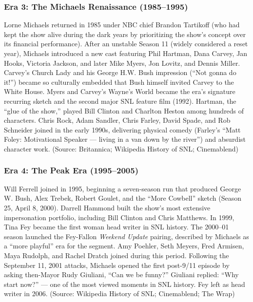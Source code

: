 \documentclass[11pt,letterpaper]{article}
\begin{document}
\subsubsection{Era 3: The Michaels Renaissance (1985--1995)}

Lorne Michaels returned in 1985 under NBC chief Brandon Tartikoff (who had kept the show alive during the dark years by prioritizing the show's concept over its financial performance). After an unstable Season 11 (widely considered a reset year), Michaels introduced a new cast featuring Phil Hartman, Dana Carvey, Jan Hooks, Victoria Jackson, and later Mike Myers, Jon Lovitz, and Dennis Miller. Carvey's Church Lady and his George H.W. Bush impression (``Not gonna do it!'') became so culturally embedded that Bush himself invited Carvey to the White House. Myers and Carvey's Wayne's World became the era's signature recurring sketch and the second major SNL feature film (1992). Hartman, the ``glue of the show,'' played Bill Clinton and Charlton Heston among hundreds of characters. Chris Rock, Adam Sandler, Chris Farley, David Spade, and Rob Schneider joined in the early 1990s, delivering physical comedy (Farley's ``Matt Foley: Motivational Speaker --- living in a van down by the river'') and absurdist character work. (Source: Britannica; Wikipedia History of SNL; Cinemablend)

\subsubsection{Era 4: The Peak Era (1995--2005)}

Will Ferrell joined in 1995, beginning a seven-season run that produced George W. Bush, Alex Trebek, Robert Goulet, and the ``More Cowbell'' sketch (Season 25, April 8, 2000). Darrell Hammond built the show's most extensive impersonation portfolio, including Bill Clinton and Chris Matthews. In 1999, Tina Fey became the first woman head writer in SNL history. The 2000--01 season launched the Fey-Fallon \textit{Weekend Update} pairing, described by Michaels as a ``more playful'' era for the segment. Amy Poehler, Seth Meyers, Fred Armisen, Maya Rudolph, and Rachel Dratch joined during this period. Following the September 11, 2001 attacks, Michaels opened the first post-9/11 episode by asking then-Mayor Rudy Giuliani, ``Can we be funny?'' Giuliani replied: ``Why start now?'' --- one of the most viewed moments in SNL history. Fey left as head writer in 2006. (Source: Wikipedia History of SNL; Cinemablend; The Wrap)
\end{document}
